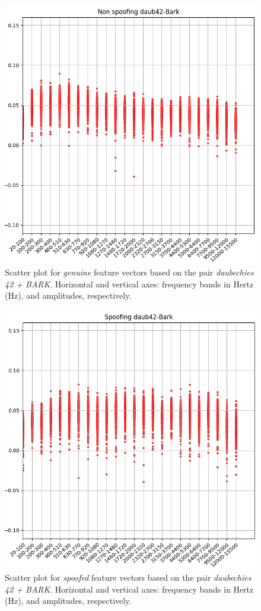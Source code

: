 \begin{figure}[H]
\centering
\includegraphics[scale=.53]{images/results/barkVersusMel/liveDaub42Bark}
\caption{Scatter plot for \textit{genuine} feature vectors based on the pair \textit{daubechies 42 + BARK}. Horizontal and vertical axes: frequency bands in Hertz (Hz), and amplitudes, respectively.}
\label{fig:livedaub42bark}
\end{figure}
\begin{figure}[H]
\centering
\includegraphics[scale=.53]{images/results/barkVersusMel/spoofingDaub42Bark}
\caption{Scatter plot for \textit{spoofed} feature vectors based on the pair \textit{daubechies 42 + BARK}. Horizontal and vertical axes: frequency bands in Hertz (Hz), and amplitudes, respectively.}
\label{fig:spoofingdaub42bark}
\end{figure}
